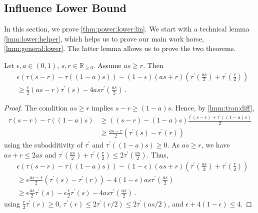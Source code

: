 \documentclass{article}
\newcommand{\R}{\mathbb{R}}
\newcommand{\Rp}{\R_{\geq0}}
\newcommand{\lb}{\left(} %
\newcommand{\rb}{\right)} %
\newcommand{\br}[1]{\lb #1 \rb} %
\newcommand{\brOf}[1]{\!\br{#1}} %
\newcommand{\pr}{^\prime}
\newcommand{\eqfs}{\,.}
\newcommand{\tran}{\tau}
\newcommand{\dtran}{\tau\pr}
\begin{document}
\subsection{Influence Lower Bound}
%
In this section, we prove \cref{thm:power:lower:lin}. We start with a technical lemma \cref{lmm:lower:helper}, which helps us to prove our main work horse, \cref{lmm:general:lower}. The latter lemma allows us to prove the two theorems.
%
\begin{lemma}\label{lmm:lower:helper}
    Let $\epsilon,a\in (0,1)$, $s,r \in \Rp$.
    Assume $as \geq r$.
    Then
    \begin{align}
        &\epsilon \br{\tran(s-r) - \tran((1-a)s)}
        - (1-\epsilon) (as + r) \br{\dtran\brOf{\frac{as}2} + \dtran\brOf{\frac{r}2}}
        \\&\geq
        \frac{\epsilon}2 \br{as-r} \dtran(s) 
        -
        4 as \dtran\brOf{\frac{as}2}
        \eqfs
    \end{align}
\end{lemma}
%
\begin{proof}
    The condition $as \geq r$ implies $s-r \geq (1-a) s$. Hence, by \cref{lmm:tran:diff},
    \begin{align}
        \tran(s-r) - \tran((1-a)s) 
        &\geq
        ((s-r)-(1-a)s) \frac{\dtran(s-r)+\dtran((1-a)s)}{2}
        \\&\geq 
        \frac{as-r}2 \br{\dtran(s)-\dtran(r)}
    \end{align}
    using the subadditivity of $\dtran$ and $\dtran((1-a)s)\geq0$.
    As $as \geq r$, we have $as+r \leq 2as$ and $\dtran\brOf{\frac{as}2} + \dtran\brOf{\frac{r}2} \leq 2 \dtran\brOf{\frac{as}2}$. Thus, 
    \begin{align}
        &\epsilon \br{\tran(s-r) - \tran((1-a)s)}
        - (1-\epsilon) (as + r) \br{\dtran\brOf{\frac{as}2} + \dtran\brOf{\frac{r}2}}
        \\&\geq
        \epsilon \frac{as-r}2 \br{\dtran(s)-\dtran(r)}
        - 4 (1-\epsilon) as \dtran\brOf{\frac{as}2}
        \\&\geq
        \epsilon \frac{as}2 \dtran(s)
        -
        \epsilon \frac{r}2 \dtran(s)
        -
        4 as \dtran\brOf{\frac{as}2}
        \eqfs
    \end{align}
    using $\frac{r}2 \dtran(r) \geq 0$, $\dtran(r) \leq  2\dtran\brOf{r/2} \leq 2\dtran\brOf{as/2}$, and $\epsilon + 4(1-\epsilon) \leq 4$.
\end{proof}
%
\end{document}
